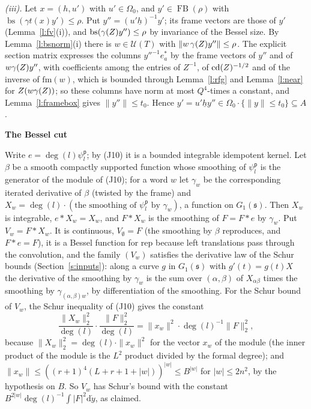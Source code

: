\documentclass[11pt,a4paper]{article}
\makeatletter
\newcommand{\sect}[2]{\refstepcounter{section}\label{#2}\par\addvspace{19pt plus 4pt minus 2pt}\Needspace{7\baselineskip}%
  \noindent\llap{{\fontsize{13.2}{16}\selectfont\bfseries\color{inkfaint}\thesection}\hspace{9pt}}%
  {\fontsize{13.2}{16}\selectfont\bfseries\color{ink}#1}\par\nopagebreak\vspace{-1pt}}
\theoremstyle{plainx}
\theoremstyle{uprightx}
\renewenvironment{proof}[1][Proof]{\par\pushQED{\qed}\normalfont\topsep0pt\partopsep0pt
  \trivlist\item[\hskip\labelsep\itshape #1.]\ignorespaces}{\popQED\endtrivlist\@endpefalse}
\newcommand{\dd}{\mathrm{d}}
\newcommand{\UT}[1]{\mathcal{U}(#1)}
\newcommand{\Gone}[1]{G_1(#1)}
\newcommand{\Inp}[1]{\textup{(#1)}}
\newcommand{\emb}[1]{\underline{#1}}
\newcommand{\bs}[1]{\operatorname{bs}(#1)}
\newcommand{\frbox}[1]{\operatorname{FB}(#1)}
\makeatother
\begin{document}
\begin{proof}[Proof of Theorem C]
\emph{(iii).} Let $x=(h,u')$ with $u'\in\Omega_0$, and $y'\in\frbox{\rho}$ with $\bs{\gamma t(x)y'}\le\rho$. Put
$y''=(u'\emb{h})^{-1}y'$; its frame vectors are those of $y'$ (Lemma~\ref{l:fv}(i)), and
$\bs{\gramSection{Z}y''}\le\rho$ by invariance of the Bessel size. By Lemma~\ref{l:bsnorm}(i) there is
$w\in\UT{T}$ with $\|w\,\gamma(Z)y''\|\le\rho$. The explicit section matrix expresses the columns
$y''^{-1}e^*_a$ by the frame vectors of $y''$ and of $w\gamma(Z)y''$, with coefficients among the entries of
$Z^{-1}$, of $\operatorname{cd}(Z)^{-1/2}$ and of the inverse of $\mathrm{fm}(w)$, which is bounded through
Lemma~\ref{l:rfg} and Lemma~\ref{l:near} for $Z(w\gamma(Z))$; so these columns have norm at most $Q^{4}$-times
a constant, and Lemma~\ref{l:framebox} gives $\|y''\|\le t_0$. Hence
$y'=u'\emb{h}y''\in\Omega_0\cdot\{\|y\|\le t_0\}\subseteq A$.
\end{proof}

\sect{The Bessel cut}{s:cut}
\begin{proof}[Proof of Theorem D\textup{(i)}]
Write $e=\deg(l)\psi^{\mathsf{p}}_l$; by \Inp{J10} it is a bounded integrable idempotent kernel. Let $\beta$ be a smooth compactly
supported function whose smoothing of $\psi^{\mathsf{p}}_l$ is the generator of the module of \Inp{J10}; for a word $w$ let
$\gamma_w$ be the corresponding iterated derivative of $\beta$ (twisted by the frame) and
$X_w=\deg(l)\cdot(\text{the smoothing of }\psi^{\mathsf{p}}_l\text{ by }\gamma_w)$, a function on $\Gone{\mathfrak{s}}$. Then $X_w$
is integrable, $e*X_w=X_w$, and $F*X_w$ is the smoothing of $F=F*e$ by $\gamma_w$. Put $V_w=F*X_w$. It is continuous,
$V_\emptyset=F$ (the smoothing by $\beta$ reproduces, and $F*e=F$), it is a Bessel function for $\mathrm{rep}$
because left translations pass through the convolution, and the family $(V_w)$ satisfies the derivative law of the
Schur bounds (Section~\ref{s:inputs}): along a curve $g$ in $\Gone{\mathfrak{s}}$ with $g'(t)=g(t)X$ the derivative of
the smoothing by $\gamma_w$ is the sum over $(\alpha,\beta)$ of $X_{\alpha\beta}$ times the smoothing by
$\gamma_{(\alpha,\beta)w}$, by differentiation of the smoothing. For the Schur bound of $V_w$, the Schur inequality
of \Inp{J10} gives the constant
\[\frac{\|X_w\|_2^{2}}{\deg(l)}\cdot\frac{\|F\|_2^{2}}{\deg(l)}=\|x_w\|^{2}\cdot\deg(l)^{-1}\|F\|_2^{2},\]
because $\|X_w\|_2^{2}=\deg(l)\cdot\|x_w\|^{2}$ for the vector $x_w$ of the module (the inner product of the module is
the $L^{2}$ product divided by the formal degree); and
$\|x_w\|\le((r+1)^{4}(L+r+1+|w|))^{|w|}\le B^{|w|}$ for $|w|\le2n^{2}$, by the hypothesis on $B$. So $V_w$ has Schur's
bound with the constant $B^{2|w|}\deg(l)^{-1}\int|F|^{2}\dd\dot y$, as claimed.
\end{proof}
\end{document}
